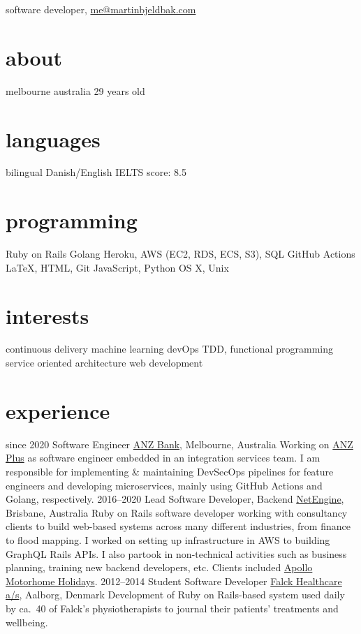 \documentclass{afriggeri-cv/friggeri-cv}
\begin{document}
{software developer, \href{mailto:me@martinbjeldbak.com}{me@martinbjeldbak.com}}

\begin{aside}
  \section{about}
    melbourne
    australia
    \hfill
    29 years old
  \section{languages}
    bilingual Danish/English
    IELTS score: 8.5
  \section{programming}
    Ruby on Rails
    Golang
    Heroku, AWS (EC2, RDS, ECS, S3), SQL
    GitHub Actions
    \LaTeX, HTML, Git
    JavaScript, Python
    OS X, Unix
  \section{interests}
    continuous delivery
    machine learning
    devOps
    TDD, functional programming
    service oriented architecture
    web development
\end{aside}

\section{experience}

\begin{entrylist}
  \entry%
    {since 2020}
    {Software Engineer}
    {\href{https://www.anz.com.au}{ANZ Bank}, Melbourne, Australia}
    {Working on \href{https://www.anz.com.au/plus}{ANZ Plus} as software engineer embedded in an
     integration services team. I am responsible for implementing \& maintaining DevSecOps pipelines
     for feature engineers and developing microservices, mainly using GitHub Actions and Golang, respectively.}
  \entry%
    {2016--2020}
    {Lead Software Developer, Backend}
    {\href{https://netengine.com.au/}{NetEngine}, Brisbane, Australia}
    {Ruby on Rails software developer working with consultancy clients to build web-based systems across
      many different industries, from finance to flood mapping. I worked on setting up infrastructure
      in AWS to building GraphQL Rails APIs.
      I also partook in non-technical activities such as business planning, training new backend developers,
      etc. Clients included \href{https://www.apollocamper.com}{Apollo Motorhome Holidays}.}
  \entry%
    {2012--2014}
    {Student Software Developer}
    {\href{https://www.falck.com/services/healthcare}{Falck Healthcare a/s}, Aalborg, Denmark}
    {Development of Ruby on Rails-based system used daily by ca.\ 40 of Falck's physiotherapists to journal their patients' treatments and wellbeing.}
\end{entrylist}
\end{document}
